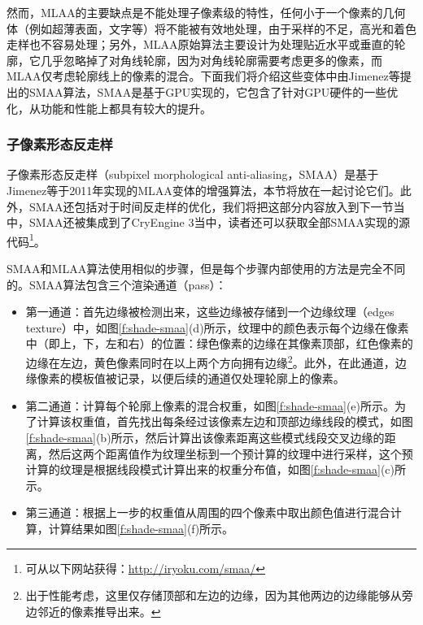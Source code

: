 然而，MLAA的主要缺点是不能处理子像素级的特性，任何小于一个像素的几何体（例如超薄表面，文字等）将不能被有效地处理，由于采样的不足，高光和着色走样也不容易处理；另外，MLAA原始算法主要设计为处理贴近水平或垂直的轮廓，它几乎忽略掉了对角线轮廓，因为对角线轮廓需要考虑更多的像素，而MLAA仅考虑轮廓线上的像素的混合。下面我们将介绍这些变体中由Jimenez等提出的SMAA算法，SMAA是基于GPU实现的，它包含了针对GPU硬件的一些优化，从功能和性能上都具有较大的提升。






\subsubsection{子像素形态反走样}
子像素形态反走样（subpixel morphological anti-aliasing，SMAA）\cite{a:SMAA:EnhancedSubpixelMorphologicalAntialiasing}是基于Jimenez等于2011年实现的MLAA\cite{a:PracticalMorphologicalAnti-Aliasing}变体的增强算法，本节将放在一起讨论它们。此外，SMAA还包括对于时间反走样的优化，我们将把这部分内容放入到下一节当中，SMAA还被集成到了CryEngine 3\cite{a:Anti-AliasingMethodsinCryENGINE3}当中，读者还可以获取全部SMAA实现的源代码\footnote{可从以下网站获得：\url{http://iryoku.com/smaa/}}。

SMAA和MLAA算法使用相似的步骤，但是每个步骤内部使用的方法是完全不同的。SMAA算法包含三个渲染通道（pass）：

\begin{itemize}
	\item 第一通道：首先边缘被检测出来，这些边缘被存储到一个边缘纹理（edges texture）中，如图\ref{f:shade-smaa}(d)所示，纹理中的颜色表示每个边缘在像素中（即上，下，左和右）的位置：绿色像素的边缘在其像素顶部，红色像素的边缘在左边，黄色像素同时在以上两个方向拥有边缘\footnote{出于性能考虑，这里仅存储顶部和左边的边缘，因为其他两边的边缘能够从旁边邻近的像素推导出来。}。此外，在此通道，边缘像素的模板值被记录，以便后续的通道仅处理轮廓上的像素。
	\item 第二通道：计算每个轮廓上像素的混合权重，如图\ref{f:shade-smaa}(e)所示。为了计算该权重值，首先找出每条经过该像素左边和顶部边缘线段的模式，如图\ref{f:shade-smaa}(b)所示，然后计算出该像素距离这些模式线段交叉边缘的距离，然后这两个距离值作为纹理坐标到一个预计算的纹理中进行采样，这个预计算的纹理是根据线段模式计算出来的权重分布值，如图\ref{f:shade-smaa}(c)所示。
	\item 第三通道：根据上一步的权重值从周围的四个像素中取出颜色值进行混合计算，计算结果如图\ref{f:shade-smaa}(f)所示。
\end{itemize}

